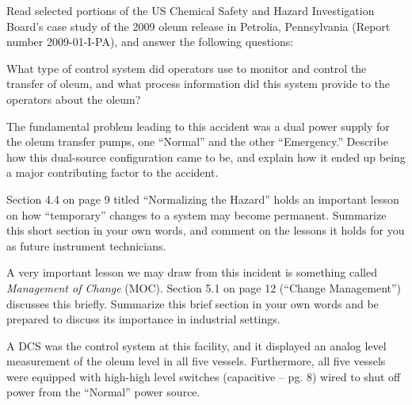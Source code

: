 

Read selected portions of the US Chemical Safety and Hazard Investigation Board's case study of the 2009 oleum release in Petrolia, Pennsylvania (Report number 2009-01-I-PA), and answer the following questions:

\vskip 10pt

What type of control system did operators use to monitor and control the transfer of oleum, and what process information did this system provide to the operators about the oleum?

\vskip 10pt

The fundamental problem leading to this accident was a dual power supply for the oleum transfer pumps, one ``Normal'' and the other ``Emergency.''  Describe how this dual-source configuration came to be, and explain how it ended up being a major contributing factor to the accident.

\vskip 10pt

Section 4.4 on page 9 titled ``Normalizing the Hazard'' holds an important lesson on how ``temporary'' changes to a system may become permanent.  Summarize this short section in your own words, and comment on the lessons it holds for you as future instrument technicians.

\vskip 10pt

A very important lesson we may draw from this incident is something called {\it Management of Change} (MOC).  Section 5.1 on page 12 (``Change Management'') discusses this briefly.  Summarize this brief section in your own words and be prepared to discuss its importance in industrial settings.














A DCS was the control system at this facility, and it displayed an analog level measurement of the oleum level in all five vessels.  Furthermore, all five vessels were equipped with high-high level switches (capacitive -- pg. 8) wired to shut off power from the ``Normal'' power source.

